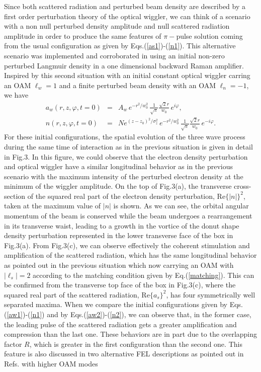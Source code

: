 \documentclass[aps,pra,preprint,showpacs,preprintnumbers,amsmath,amssymb]{revtex4-1}
\begin{document}
Since both scattered radiation and perturbed beam density are described by a first order perturbation theory of the optical wiggler, we can think of a scenario with a non null perturbed density amplitude and null scattered radiation amplitude in order to produce the same features of $\pi-$pulse solution coming from the usual configuration as given by Eqs.(\ref{as1})-(\ref{n1}). This alternative scenario was implemented and corroborated in \cite{plasmaseed} using an initial non-zero perturbed Langmuir density in a one dimensional backward Raman amplifier. Inspired by this second situation with an initial constant optical wiggler carring an OAM $\ell_w = 1$ and a finite perturbed beam density with an OAM $\ell_n = -1$, we have
\begin{eqnarray}
a_w(r,z,\varphi, t=0) &=& A_w \, e^{-r^2/w_0^2} \,\frac{1}{\sqrt{\pi}} \frac{\sqrt{2} r}{w_0} \, e^{i \varphi}, \label{aw2}\\
n(r,z,\varphi, t=0) &=& N e^{(z-z_0)^2/\sigma_z^2}\, e^{-r^2/w_0^2} \,\frac{1}{\sqrt{\pi}} \frac{\sqrt{2} r}{w_0} \, e^{-i \varphi}. \label{n2}
\end{eqnarray}
For these initial configurations, the spatial evolution of the three wave process during the same time of interaction as in the previous situation is given in detail in Fig.3. In this figure, we could observe that the electron density perturbation and optical wiggler have a similar longitudinal behavior as in the previous scenario with the maximum intensity of the perturbed electron density at the minimum of the wiggler amplitude. On the top of Fig.3(a), the transverse cross-section of the squared real part of the electron density perturbation, Re$\{|n|\}^2$, taken at the maximum value of $|n|$ is shown. As we can see, the orbital angular momentum of the beam is conserved while the beam undergoes a rearrangement in its transverse waist, leading to a growth in the vortice of the donut shape density perturbation represented in the lower transverse face of the box in Fig.3(a). From Fig.3(c), we can observe effectively the coherent stimulation and amplification of the scattered radiation,  which has the same longitudinal behavior as pointed out in the previous situation which now carrying an OAM with $|\ell_s| = 2$ according to the matching condition given by Eq.(\ref{matching}). This can be confirmed from the transverse top face of the box in Fig.3(c), where the squared real part of the scattered radiation, Re$\{a_s\}^2$, has four symmetrically well separated maxima.
When we compare the initial configurations given by Eqs.(\ref{aw1})-(\ref{n1}) and by Eqs.(\ref{aw2})-(\ref{n2}), we can observe that, in the former case, the leading pulse of the scattered radiation gets a greater amplification and compression than the last one. These behaviors are in part due to the overlapping factor $R$, which  is greater in the first configuration than the second one. This feature is also discussed in two alternative FEL descriptions as pointed out in Refs.\cite{hemsing2008, sprangle2009} with higher OAM modes \\
\end{document}
